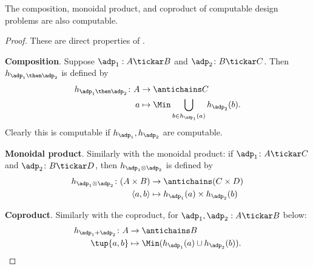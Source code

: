 \begin{proposition}
The composition, monoidal product, and coproduct of computable design problems are also computable.
\end{proposition}

\begin{proof}
These are direct properties of \DP.

 

\textbf{Composition}. Suppose $\adp_1 : A \tickar B$ and $\adp_2 \colon B \tickar C$. Then $h_{\adp_1\then \adp_2} $ is defined by
\begin{equation}
\begin{aligned}
h_{\adp_1 \then \adp_2} \colon A &\to \antichains C \\
a &\mapsto \Min \bigcup_{b \in h_{\adp_1}(a)} h_{\adp_2}(b).
\end{aligned}
\end{equation}
Clearly this is computable if $h_{\adp_1}, h_{\adp_2}$ are computable.

 

\textbf{Monoidal product}. Similarly with the monoidal product: if $\adp_1 \colon A \tickar C$ and $\adp_2 \colon B \tickar D$, then $h_{\adp_1 \otimes \adp_2}$ is defined by
\begin{equation}
\begin{aligned}
h_{\adp_1 \otimes \adp_2} \colon (A \times B) &\to \antichains (C \times D) \\
\langle a, b \rangle &\mapsto h_{\adp_1}(a) \times h_{\adp_2}(b)
\end{aligned}
\end{equation}

\textbf{Coproduct}. Similarly with the coproduct, for $\adp_1, \adp_2 : A \tickar B$ below:
\begin{equation}
\begin{aligned}
h_{\adp_1 + \adp_2} \colon  A &\to \antichains B \\
\tup{a,b} &\mapsto \Min (h_{\adp_1}(a) \cup h_{\adp_2}(b)).
\end{aligned}
\end{equation}

 
\end{proof}

